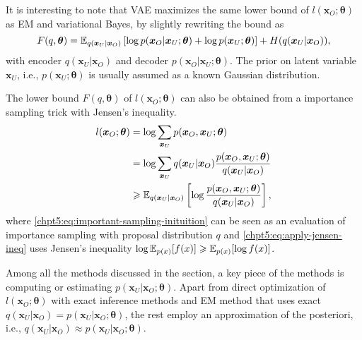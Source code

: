 It is interesting to note that VAE maximizes the same lower bound of $l(\bm{x}_O;\bm{\theta})$ as EM and variational Bayes, by slightly rewriting the bound as
\begin{equation}
  F(q, \bm{\theta}) = \mathbb{E}_{q(\bm{x}_U|\bm{x}_O)}\left[ \log{{p}(\bm{x}_O| \bm{x}_U; \bm{\theta})} + \log{{p}(\bm{x}_U; \bm{\theta})} \right] + H({q(\bm{x}_U|\bm{x}_O)}),
\end{equation}
with encoder $q(\bm{x}_U|\bm{x}_O)$ and decoder ${p}(\bm{x}_O| \bm{x}_U; \bm{\theta})$. The prior on latent variable $\bm{x}_U$, i.e., ${p}(\bm{x}_U; \bm{\theta})$ is usually assumed as a known Gaussian distribution.


\begin{remark}
  The lower bound $F(q, \bm{\theta})$ of $l(\bm{x}_O; \bm{\theta})$ can also be obtained from a importance sampling trick with Jensen's inequality.
  \begin{align}
    l(\bm{x}_O; \bm{\theta}) & = \log{\sum_{\bm{x}_U} {p}(\bm{x}_O, \bm{x}_U; \bm{\theta})} \nonumber \\
                             & = \log{\sum_{\bm{x}_U} {q(\bm{x}_U|\bm{x}_O)}\frac{{p}(\bm{x}_O, \bm{x}_U; \bm{\theta})}{q(\bm{x}_U|\bm{x}_O)} } \label{chpt5:eq:important-sampling-inituition}\\
                             & \geqslant \mathbb{E}_{q(\bm{x}_U|\bm{x}_O)}\left[ \log{\frac{{p}(\bm{x}_O, \bm{x}_U; \bm{\theta})}{q(\bm{x}_U|\bm{x}_O)}}\right] \label{chpt5:eq:apply-jensen-ineq},
  \end{align}
  where \eqref{chpt5:eq:important-sampling-inituition} can be seen as an evaluation of importance sampling with proposal distribution $q$ and \eqref{chpt5:eq:apply-jensen-ineq} uses Jensen's inequality $\log{\mathbb{E}_{p(x)}[f(x)] \geqslant\mathbb{E}_{p(x)}[\log{f(x)}]}$.
\end{remark}

\begin{remark}
  Among all the methods discussed in the section, a key piece of the methods is computing or estimating $p(\bm{x}_U| \bm{x}_O; \bm{\theta})$. Apart from direct optimization of $l(\bm{x}_O;\bm{\theta})$ with exact inference methods and EM method that uses exact $q(\bm{x}_U| \bm{x}_O) = p(\bm{x}_U| \bm{x}_O; \bm{\theta})$, the rest employ an approximation of the posteriori, i.e., $q(\bm{x}_U| \bm{x}_O) \approx p(\bm{x}_U| \bm{x}_O; \bm{\theta})$.
\end{remark}

